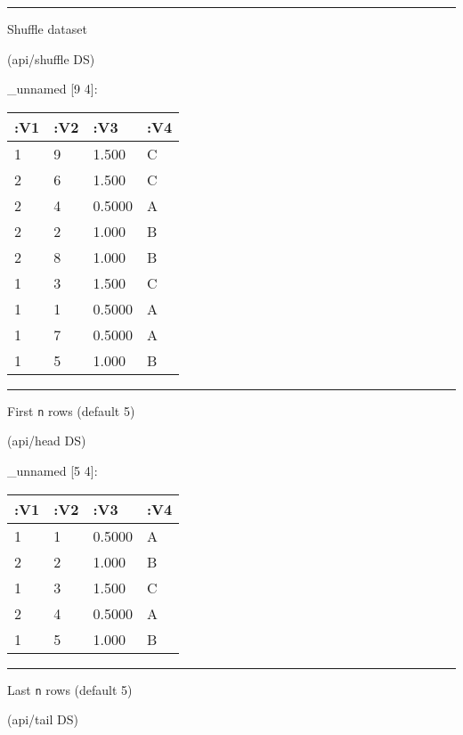 \documentclass[]{article}
\newenvironment{Shaded}{\begin{snugshade}}{\end{snugshade}}
\newcommand{\NormalTok}[1]{#1}
\begin{document}
\begin{center}\rule{0.5\linewidth}{0.5pt}\end{center}

Shuffle dataset

\begin{Shaded}
\begin{Highlighting}[]
\NormalTok{(api/shuffle DS)}
\end{Highlighting}
\end{Shaded}

\_unnamed {[}9 4{]}:

\begin{longtable}[]{@{}llll@{}}
\toprule
:V1 & :V2 & :V3 & :V4\tabularnewline
\midrule
\endhead
1 & 9 & 1.500 & C\tabularnewline
2 & 6 & 1.500 & C\tabularnewline
2 & 4 & 0.5000 & A\tabularnewline
2 & 2 & 1.000 & B\tabularnewline
2 & 8 & 1.000 & B\tabularnewline
1 & 3 & 1.500 & C\tabularnewline
1 & 1 & 0.5000 & A\tabularnewline
1 & 7 & 0.5000 & A\tabularnewline
1 & 5 & 1.000 & B\tabularnewline
\bottomrule
\end{longtable}

\begin{center}\rule{0.5\linewidth}{0.5pt}\end{center}

First \texttt{n} rows (default 5)

\begin{Shaded}
\begin{Highlighting}[]
\NormalTok{(api/head DS)}
\end{Highlighting}
\end{Shaded}

\_unnamed {[}5 4{]}:

\begin{longtable}[]{@{}llll@{}}
\toprule
:V1 & :V2 & :V3 & :V4\tabularnewline
\midrule
\endhead
1 & 1 & 0.5000 & A\tabularnewline
2 & 2 & 1.000 & B\tabularnewline
1 & 3 & 1.500 & C\tabularnewline
2 & 4 & 0.5000 & A\tabularnewline
1 & 5 & 1.000 & B\tabularnewline
\bottomrule
\end{longtable}

\begin{center}\rule{0.5\linewidth}{0.5pt}\end{center}

Last \texttt{n} rows (default 5)

\begin{Shaded}
\begin{Highlighting}[]
\NormalTok{(api/tail DS)}
\end{Highlighting}
\end{Shaded}
\end{document}
